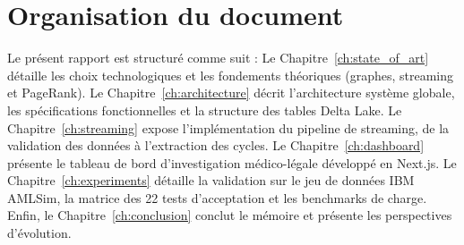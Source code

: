 \section{Organisation du document}

Le présent rapport est structuré comme suit :
Le Chapitre~\ref{ch:state_of_art} détaille les choix technologiques et les fondements théoriques (graphes, streaming et PageRank).
Le Chapitre~\ref{ch:architecture} décrit l'architecture système globale, les spécifications fonctionnelles et la structure des tables Delta Lake.
Le Chapitre~\ref{ch:streaming} expose l'implémentation du pipeline de streaming, de la validation des données à l'extraction des cycles.
Le Chapitre~\ref{ch:dashboard} présente le tableau de bord d'investigation médico-légale développé en Next.js.
Le Chapitre~\ref{ch:experiments} détaille la validation sur le jeu de données IBM AMLSim, la matrice des 22 tests d'acceptation et les benchmarks de charge.
Enfin, le Chapitre~\ref{ch:conclusion} conclut le mémoire et présente les perspectives d'évolution.

\newpage
